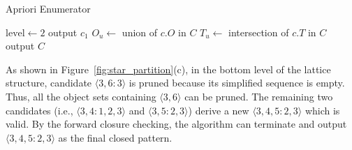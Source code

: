 \begin{algorithm}[h]
\caption{Apriori Enumerator}
\label{algo:apriori_mining}
\begin{algorithmic}[1]
 \label{code:init-start}
 \label{code:simp1}
\EndIf 
\EndFor\label{code:init-end}
\State $\mathrm{level} \gets 2$ \label{code:level}
 \label{code:level-start}
		\label{code:join-start}	
			 \label{code:join}			
			 \label{code:simp2}
			\EndIf			
		\EndFor\label{code:join-end}
		 \label{code:output1-start}
				\State output $c_1$
			\EndIf
		\EndIf \label{code:output1-end}
	\EndFor
	\State $O_u \gets $ union of $c.O$ in $C$	\label{code:fc-checking-start}
	\State $T_u \gets $ intersection of $c.T$ in $C$	
		 \label{code:fc-checking}
	\EndIf \label{code:fc-checking-end}
\EndWhile\label{code:level-ends}
\State output $C$ \label{code:output2-end}
\end{algorithmic}
\end{algorithm}



\begin{example}
As shown in Figure~\ref{fig:star_partition}(c), in the bottom level of the lattice structure, candidate $\langle 3,6:3 \rangle $ is pruned because its simplified sequence is empty. Thus, all the object sets containing $\langle 3,6 \rangle $ can be pruned. The remaining two candidates (i.e., $\langle 3,4:1,2,3 \rangle$ and $\langle 3,5:2,3 \rangle$)  derive a new  $\langle 3,4,5:2,3 \rangle$ which is valid. By the forward closure checking, the algorithm can terminate and output $\langle 3,4,5:2,3 \rangle$ as the final closed pattern.
\end{example}



